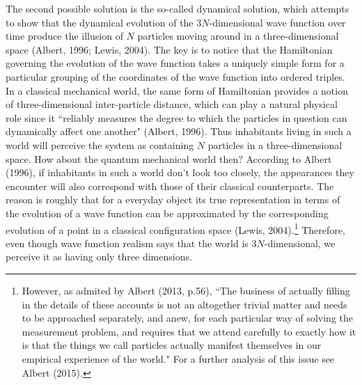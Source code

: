 The second possible solution is the so-called dynamical solution, which attempts to show that the dynamical evolution of the $3N$-dimensional wave function over time produce the illusion of $N$ particles moving around in a  three-dimensional space (Albert, 1996; Lewis, 2004).
The key is to notice that the Hamiltonian governing the evolution of the wave function takes a uniquely simple form for a particular grouping of the coordinates of the wave function  into ordered triples.
In a classical mechanical world, the same form of Hamiltonian provides a notion of three-dimensional inter-particle distance, which can play a natural physical role since it ``reliably measures the degree to which the particles in question can dynamically affect one another" (Albert, 1996). %
Thus inhabitants living in such a world will perceive the system as containing $N$ particles in  a  three-dimensional space. 
How about the quantum mechanical world then?
According to Albert (1996), if inhabitants in such a world don't look too closely, the appearances they encounter will also correspond with those of their classical counterparts. The reason is roughly that for a everyday object its true representation in terms of the evolution of a wave function can be approximated by the corresponding evolution of a point in a classical configuration space (Lewis, 2004).\footnote{However, as admited by Albert (2013, p.56), ``The business of actually filling in the details of these accounts is not an altogether trivial matter and needs to be approached separately, and anew, for each particular way of solving the measurement problem, and requires that we attend carefully to exactly how it is that the things we call particles actually manifest themselves in our empirical experience of the world." For a further analysis of this issue see Albert (2015).} Therefore, even though wave function realism says that the world is $3N$-dimensional, we perceive it as having only three dimensions. 

